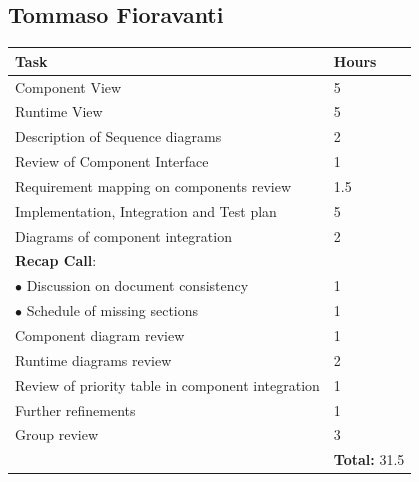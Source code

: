 \documentclass{report}
\begin{document}
\subsection*{Tommaso Fioravanti}
\begin{table}[!ht]
	\begin{tabular}{|C{.60\textwidth}||C{.20\textwidth}|}
		\toprule
        \textbf{Task} & \textbf{Hours}\\
        \midrule
        Component View & 5\\
        \midrule
        Runtime View  & 5\\
        \midrule
        Description of Sequence diagrams & 2\\
        \midrule
        Review of Component Interface & 1\\
        \midrule
        Requirement mapping on components review & 1.5 \\
        \midrule
        Implementation, Integration and Test plan & 5\\
        \midrule
        Diagrams of component integration & 2\\
        \midrule
        \small{\textbf{Recap Call}}: & \\
		\vspace{.2mm}
		$\bullet$ Discussion on document consistency & \vspace{.2mm} 1\\
        $\bullet$ Schedule of missing sections & 1\\
        \midrule
         Component diagram review & 1\\
        \midrule
        Runtime diagrams review &2\\
        \midrule
        Review of priority table in component integration&1\\
        \midrule
        Further refinements&1\\
        \midrule
        Group review & 3\\
        \midrule
		& \textbf{Total:} 31.5\\
		\bottomrule
	\end{tabular}
\end{table}
\end{document}
